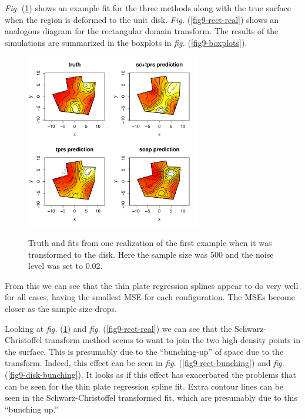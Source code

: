\documentclass[a4paper,10pt]{amsart}
\newcommand{\sch}{Schwarz-Christoffel }
\newcommand{\fig}[1]{\emph{fig.} (\ref{#1})}
\newcommand{\Fig}[1]{\emph{Fig.} (\ref{#1})}
\begin{document}
\Fig{fig9-disk-real} shows an example fit for the three methods along with the true surface when the region is deformed to the unit disk. \Fig{fig9-rect-real} shows an analogous diagram for the rectangular domain transform. The results of the simulations are summarized in the boxplots in \fig{fig9-boxplots}.

\begin{figure}[tbp]
\centering
\includegraphics[width=3in]{figs-otherdomains/fig9-disk-real.pdf} \\
\caption{Truth and fits from one realization of the first example when it was transformed to the disk. Here the sample size was 500 and the noise level was set to 0.02.}
\label{fig9-disk-real}
\end{figure}

From this we can see that the thin plate regression splines appear to do very well for all cases, having the smallest MSE for each configuration. The MSEs become closer as the sample size drops.

Looking at \fig{fig9-disk-real} and \fig{fig9-rect-real} we can see that the \sch transform method seems to want to join the two high density points in the surface. This is presumably due to the ``bunching-up'' of space due to the transform. Indeed, this effect can be seen in \fig{fig9-rect-bunching} and \fig{fig9-disk-bunching}. It looks as if this effect has exacerbated the problems that can be seen for the thin plate regression spline fit. Extra contour lines can be seen in the \sch transformed fit, which are presumably due to this ``bunching up.''
\end{document}
